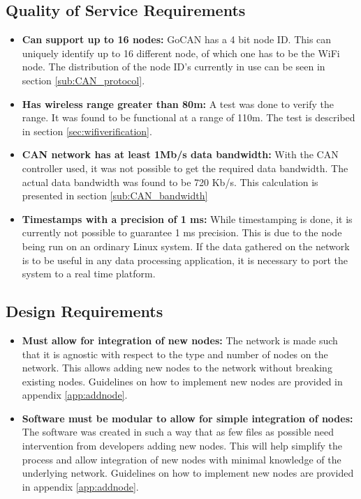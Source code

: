 \subsection{Quality of Service Requirements}
\begin{itemize}
	\item[\cmark] \textbf{Can support up to 16 nodes:}
	GoCAN has a 4 bit node ID.
	This can uniquely identify up to 16 different node, of which one has to be the WiFi node.
	The distribution of the node ID's currently in use can be seen in section \ref{sub:CAN_protocol}.
	\item[\cmark] \textbf{Has wireless range greater than 80m:}
	A test was done to verify the range.
	It was found to be functional at a range of 110m.
	The test is described in section \ref{sec:wifiverification}.
	\item[\xmark] \textbf{CAN network has at least 1Mb/s data bandwidth:}
	With the CAN controller used, it was not possible to get the required data bandwidth.
	The actual data bandwidth was found to be 720 Kb/s.
	This calculation is presented in section \ref{sub:CAN_bandwidth}
	\item[\xmark] \textbf{Timestamps with a precision of 1 ms:}
	While timestamping is done, it is currently not possible to guarantee 1 ms precision.
	This is due to the node being run on an ordinary Linux system.
	If the data gathered on the network is to be useful in any data processing application, it is necessary to port the system to a real time platform.
\end{itemize}

\subsection{Design Requirements}
\begin{itemize}
	\item[\cmark] \textbf{Must allow for integration of new nodes:}
	The network is made such that it is agnostic with respect to the type and number of nodes on the network.
	This allows adding new nodes to the network without breaking existing nodes.
	Guidelines on how to implement new nodes are provided in appendix \ref{app:addnode}.
	\item[\cmark] \textbf{Software must be modular to allow for simple integration of nodes:}
	The software was created in such a way that as few files as possible need intervention from developers adding new nodes.
	This will help simplify the process and allow integration of new nodes with minimal knowledge of the underlying network.
	Guidelines on how to implement new nodes are provided in appendix \ref{app:addnode}.
\end{itemize}

